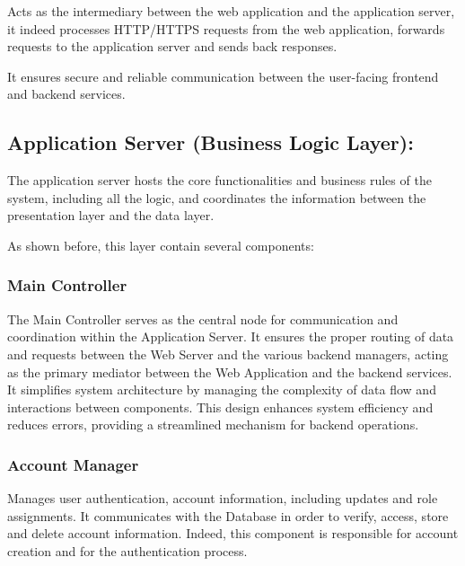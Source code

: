 Acts as the intermediary between the web application and the application server, it indeed processes HTTP/HTTPS requests from the web application, forwards requests to the application server and sends back responses.

It ensures secure and reliable communication between the user-facing frontend and backend services.


\subsection{Application Server (Business Logic Layer):}
\label{subsec:application_server}%

The application server hosts the core functionalities and business rules of the system, including all the logic, and coordinates the information between the presentation layer and the data layer.

As shown before, this layer contain several components:
\subsubsection{Main Controller}
The Main Controller serves as the central node for communication and coordination within the Application Server. It ensures the proper routing of data and requests between the Web Server and the various backend managers, acting as the primary mediator between the Web Application and the backend services.
It simplifies system architecture by managing the complexity of data flow and interactions between components. This design enhances system efficiency and reduces errors, providing a streamlined mechanism for backend operations.

\clearpage %
\subsubsection{Account Manager}
         Manages user authentication, account information, including updates and role assignments. It communicates with the Database in order to verify, access, store and delete account information. Indeed, this component is responsible for account creation and for the authentication process.
    
